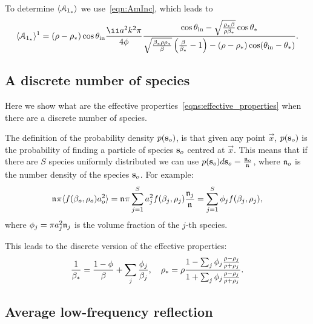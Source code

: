 \documentclass[ 12pt, a4paper]{article}
\begin{document}
To determine $\langle \mathcal A_{{1}_*} \rangle$ we use~\eqref{eqn:AmInc}, which leads to
\begin{equation}
  \ensem{\A{{1}_\eff}}^1 = (\rho-\rho_\eff) \cos \theta_\inc \frac{\ii a^2 k^2 \pi}{4 \phi}  \frac{ \cos \theta_\inc -\sqrt{\frac{\rho_\eff \beta}{\rho \beta_\eff}} \cos \theta_\eff}{
  \sqrt{\frac{\beta_\eff \rho \rho_\eff}{\beta}}\left(\frac{\beta}{\beta_\eff} -1 \right) - (\rho-\rho_\eff)\cos(\theta_\inc -\theta_\eff)
  }.
  \label{eqn:A1}
\end{equation}

\subsection{A discrete number of species}

Here we show what are the effective properties~\eqref{eqns:effective_properties} when there are a discrete number of species.

The definition of the probability density $p(\mathbf s_o)$, is that given any point $\vec x$, $p(\mathbf s_o)$ is the probability of finding a particle of species $\mathbf s_o$ centred at $\vec x$. This means that if there are $S$ species uniformly distributed we can use $p(\mathbf s_o) d\mathbf s_o = \frac{\mathfrak n_{o}}{\mathfrak n_{}}$, where $\mathfrak n_{o}$ is the number density of the species $\mathbf s_o$. For example:
\begin{equation}
  \mathfrak n_{} \pi \langle f(\beta_o,\rho_o)a_o^2 \rangle = \mathfrak n_{} \pi \sum_{j=1}^S a_j^2 f(\beta_j,\rho_j)\frac{\mathfrak n_{j}}{\mathfrak n_{}} =   \sum_{j=1}^S \phi_j f(\beta_j,\rho_j),
\end{equation}
where $\phi_j = \pi a_j^2 \mathfrak n_{j}$ is the volume fraction of the $j$-th species.


 This leads to the discrete version of the effective properties:
\begin{equation}
  \frac{1}{\beta_*} = \frac{1-\phi}{\beta} + \sum_j  \frac{\phi_j}{\beta_j}, \quad
  \rho_* = \rho \frac{1 - \sum_j  \phi_j \frac{\rho-\rho_j}{\rho+\rho_j}}{1 + \sum_j  \phi_j \frac{\rho-\rho_j}{\rho+\rho_j}}.
\end{equation}

\subsection{Average low-frequency reflection}
\end{document}
